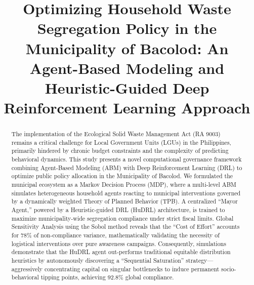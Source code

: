 \documentclass[conference,a4paper]{IEEEtran}
\begin{document}
\title{Optimizing Household Waste Segregation Policy in the Municipality of Bacolod: An Agent-Based Modeling and Heuristic-Guided Deep Reinforcement Learning Approach}

\author{
\and
{}
\and
{}
}

\maketitle

\begin{abstract}
The implementation of the Ecological Solid Waste Management Act (RA 9003) remains a critical challenge for Local Government Units (LGUs) in the Philippines, primarily hindered by chronic budget constraints and the complexity of predicting behavioral dynamics. This study presents a novel computational governance framework combining Agent-Based Modeling (ABM) with Deep Reinforcement Learning (DRL) to optimize public policy allocation in the Municipality of Bacolod. We formulated the municipal ecosystem as a Markov Decision Process (MDP), where a multi-level ABM simulates heterogeneous household agents reacting to municipal interventions governed by a dynamically weighted Theory of Planned Behavior (TPB). A centralized ``Mayor Agent,'' powered by a Heuristic-guided DRL (HuDRL) architecture, is trained to maximize municipality-wide segregation compliance under strict fiscal limits. Global Sensitivity Analysis using the Sobol method reveals that the ``Cost of Effort'' accounts for 78\% of non-compliance variance, mathematically validating the necessity of logistical interventions over pure awareness campaigns. Consequently, simulations demonstrate that the HuDRL agent out-performs traditional equitable distribution heuristics by autonomously discovering a ``Sequential Saturation'' strategy—aggressively concentrating capital on singular bottlenecks to induce permanent socio-behavioral tipping points, achieving 92.8\% global compliance.
\end{abstract}
\end{document}

